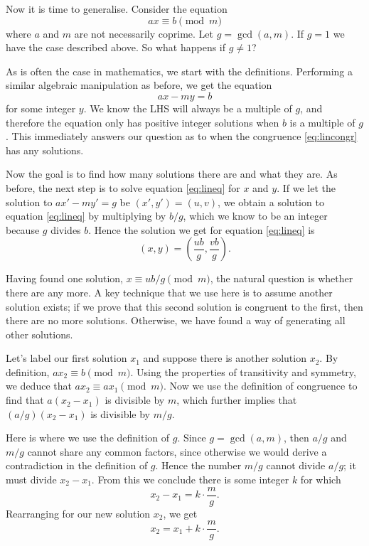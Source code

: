 Now it is time to generalise. Consider the equation \begin{equation}ax\equiv b\pmod{m}\label{eq:lincongr}\end{equation} where \(a\) and \(m\)
are not necessarily coprime. Let \(g=\gcd(a,m)\). If \(g=1\) we have the case described above.
So what happens if \(g\not=1\)?

As is often the case in mathematics, we start with the definitions. Performing a similar algebraic
manipulation as before, we get the equation \begin{equation}ax-my=b\label{eq:lineq}\end{equation} for some integer \(y\). We know the LHS
will always be a multiple of \(g\), and therefore the equation only has positive integer solutions
when \(b\) is a multiple of \(g\). This immediately answers our question as to when the congruence \eqref{eq:lincongr}
has any solutions.

Now the goal is to find how many solutions there are and what they are. As before, the next step
is to solve equation \eqref{eq:lineq} for \(x\) and \(y\). If we let the solution to \(ax'-my'=g\)
be \((x',y')=(u,v)\), we obtain a solution to equation \eqref{eq:lineq} by multiplying by \(b/g\),
which we know to be an integer because \(g\) divides \(b\). Hence the solution we get for equation \eqref{eq:lineq}
is \[(x,y)=\left(\frac{ub}{g},\frac{vb}{g}\right).\]

Having found one solution, \(x\equiv ub/g\pmod{m}\), the natural question is whether there are any more. A key
technique that we use here is to assume another solution exists; if we prove that this second solution is congruent
to the first, then there are no more solutions. Otherwise, we have found a way of generating all other solutions.

Let's label our first solution \(x_1\) and suppose there is another solution \(x_2\). By definition, \(ax_2\equiv b\pmod{m}\).
Using the properties of transitivity and symmetry, we deduce that \(ax_2\equiv ax_1\pmod{m}\). Now we use the definition of congruence to find that \(a(x_2-x_1)\) is divisible by \(m\), which further
implies that \((a/g)(x_2-x_1)\) is divisible by \(m/g\).

Here is where we use the definition of \(g\). Since \(g=\gcd(a,m)\), then \(a/g\) and \(m/g\) cannot share any common
factors, since otherwise we would derive a contradiction in the definition of \(g\). Hence the number \(m/g\) cannot
divide \(a/g\); it must divide \(x_2-x_1\). From this we conclude there is some integer \(k\) for which
\[x_2-x_1=k\cdot\frac{m}{g}.\] Rearranging for our new solution \(x_2\), we get
\[x_2=x_1+k\cdot\frac{m}{g}.\]

